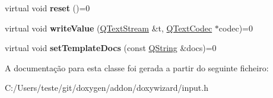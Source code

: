 \begin{DoxyCompactItemize}
\item 
\hypertarget{class_input_a20dcbdfbd0ec77afc802522bb7e379c1}{virtual void {\bfseries reset} ()=0}\label{class_input_a20dcbdfbd0ec77afc802522bb7e379c1}

\item 
\hypertarget{class_input_a522b865b3cbe98b3e7f62ceccd3b58e1}{virtual void {\bfseries write\-Value} (\hyperlink{class_q_text_stream}{Q\-Text\-Stream} \&t, \hyperlink{class_q_text_codec}{Q\-Text\-Codec} $\ast$codec)=0}\label{class_input_a522b865b3cbe98b3e7f62ceccd3b58e1}

\item 
\hypertarget{class_input_a02f3070538602675a6d08a56b2f49df6}{virtual void {\bfseries set\-Template\-Docs} (const \hyperlink{class_q_string}{Q\-String} \&docs)=0}\label{class_input_a02f3070538602675a6d08a56b2f49df6}

\end{DoxyCompactItemize}


A documentação para esta classe foi gerada a partir do seguinte ficheiro\-:\begin{DoxyCompactItemize}
\item 
C\-:/\-Users/teste/git/doxygen/addon/doxywizard/input.\-h\end{DoxyCompactItemize}
